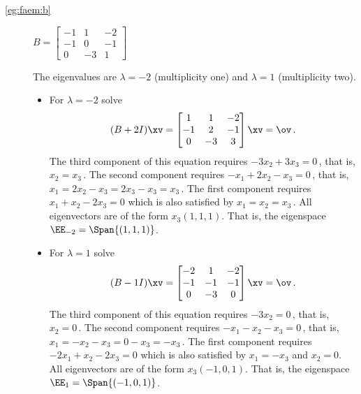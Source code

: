 \begin{example}
\begin{description}
\item[\ref{eg:faem:b}]
\(B=\begin{bmatrix}-1&1&-2
\\-1&0&-1
\\0&-3&1 \end{bmatrix}\)
\begin{solution} 
The eigenvalues are \(\lambda=-2\) (multiplicity one) and \(\lambda=1\) (multiplicity two).
\begin{itemize}
\item For \(\lambda=-2\) solve
\begin{equation*}
(B+2I)\xv=\begin{bmatrix}1&1&-2
\\-1&2&-1
\\0&-3&3 \end{bmatrix}\xv=\ov\,.
\end{equation*}
The third component of this equation requires \(-3x_2+3x_3=0\)\,, that is, \(x_2=x_3\)\,.
The second component requires \(-x_1+2x_2-x_3=0\)\,, that is, \(x_1=2x_2-x_3=2x_3-x_3=x_3\)\,.
The first component requires \(x_1+x_2-2x_3=0\) which is also satisfied by \(x_1=x_2=x_3\)\,.
All eigenvectors are of the form \(x_3(1,1,1)\).
That is, the eigenspace \(\EE_{-2}=\Span\{(1,1,1)\}\).

\item For \(\lambda=1\) solve
\begin{equation*}
(B-1I)\xv=\begin{bmatrix}-2&1&-2
\\-1&-1&-1
\\0&-3&0 \end{bmatrix}\xv=\ov\,.
\end{equation*}
The third component of this equation requires \(-3x_2=0\)\,, that is, \(x_2=0\)\,.
The second component requires \(-x_1-x_2-x_3=0\)\,, that is, \(x_1=-x_2-x_3=0-x_3=-x_3\)\,.
The first component requires \(-2x_1+x_2-2x_3=0\) which is also satisfied by \(x_1=-x_3\) and \(x_2=0\).
All eigenvectors are of the form \(x_3(-1,0,1)\).
That is, the eigenspace \(\EE_{1}=\Span\{(-1,0,1)\}\).
\end{itemize}


\end{solution}
\end{description}
\end{example}
